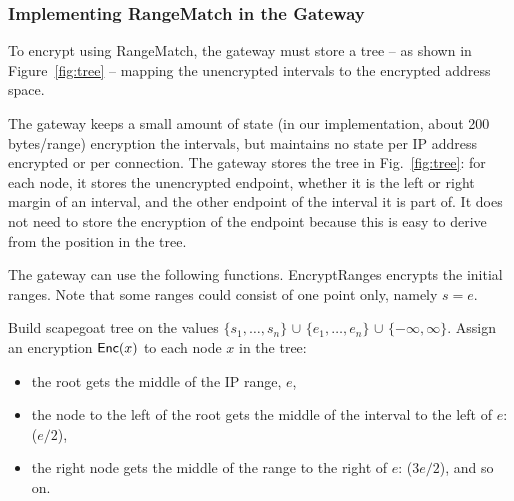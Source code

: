 \subsubsection{Implementing RangeMatch in the Gateway}
\label{sec:tree}
To encrypt using RangeMatch, the gateway must store a tree -- as shown in Figure~\ref{fig:tree} -- mapping the unencrypted intervals to the encrypted address space.

The gateway keeps a small amount of state (in our implementation, about 200 bytes/range) encryption the intervals, but maintains no state per IP address encrypted or per connection. The gateway stores the tree in Fig.~\ref{fig:tree}: for each node, it stores the unencrypted endpoint, whether it is the left or  right margin of an interval, and the other endpoint of the interval it is part of. It does not need to store the encryption of the endpoint because this is easy to derive from the position in the tree. 


The gateway can use the following functions. EncryptRanges encrypts the initial ranges. Note that some ranges could consist of
one point only, namely $s = e$. 


\begin{framed}
\begin{algorithmic}[1]

  \State Build scapegoat tree on the values 
              $\{s_1, \dots, s_n\}$ 
              $\cup$ $\{e_1, \dots, e_n\}$ 
              $\cup$ $\{-\infty, \infty\}$.
  \State Assign an encryption $\mathsf{Enc}(x)$ to each node $x$ in the tree:
  \begin{itemize}
  \item the root gets the middle of the IP range, $e$, 
  \item the node to the left of the root gets the middle of the interval to the left of $e$: ($e/2$),
  \item the right node gets the middle of the range
  to the right of $e$: ($3e/2$), and so on.
  \end{itemize}

  \State {}
\EndProcedure

\end{algorithmic}
\end{framed}


